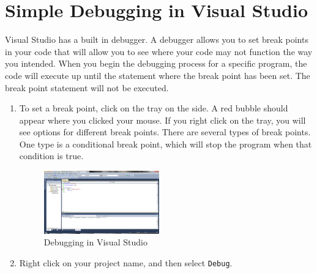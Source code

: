 \documentclass[twocolumn]{article}
\begin{document}
\section{Simple Debugging in Visual Studio} Visual Studio has a built in debugger. A debugger allows you to set break points in your code that will allow you to see where your code may not function the way you intended. When you begin the debugging process for a specific program, the code will execute up until the statement where the break point has been set. The break point statement will not be executed.
\begin{enumerate}
  \item To set a break point, click on the tray on the side. A red bubble should appear where you clicked your mouse. If you right click on the tray, you will see options for different break points. There are several types of break points. One type is a conditional break point, which will stop the program when that condition is true. 
 \begin{figure}[htbp]
		\centering
		\includegraphics[width=0.47\textwidth]{5.png}
		\caption{Debugging in Visual Studio}
		\label{fig:debug}
	\end{figure}
  \item Right click on your project name, and then select \texttt{Debug}. 
\end{enumerate}
\end{document}
